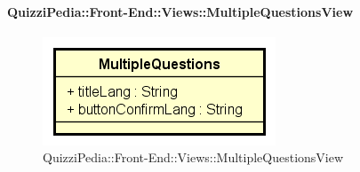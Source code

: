 \paragraph{QuizziPedia::Front-End::Views::MultipleQuestionsView}
\begin{figure} [ht]
	\centering
	\includegraphics[scale=0.45]{UML/Classi/Front-End/QuizziPedia_Front-end_Views_MultipleQuestionsView.png}
	\caption{QuizziPedia::Front-End::Views::MultipleQuestionsView}
\end{figure} \FloatBarrier
